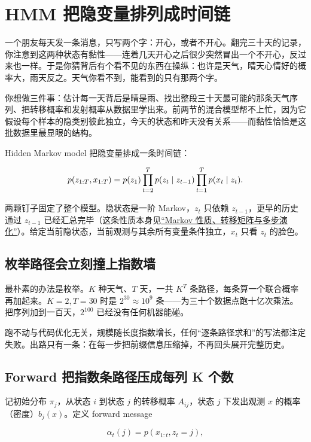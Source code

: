 \section{HMM 把隐变量排列成时间链}
\label{sec:13-Machine-Learning/06-Probabilistic-Models/05}

一个朋友每天发一条消息，只写两个字：开心，或者不开心。翻完三十天的记录，你注意到这两种状态有黏性——连着几天开心之后很少突然冒出一个不开心，反过来也一样。于是你猜背后有个看不见的东西在操纵：也许是天气，晴天心情好的概率大，雨天反之。天气你看不到，能看到的只有那两个字。

你想做三件事：估计每一天背后是晴是雨、找出整段三十天最可能的那条天气序列、把转移概率和发射概率从数据里学出来。前两节的混合模型帮不上忙，因为它假设每个样本的隐类别彼此独立，今天的状态和昨天没有关系——而黏性恰恰是这批数据里最显眼的结构。

Hidden Markov model 把隐变量排成一条时间链：

\[
p(z_{1:T},x_{1:T})
=p(z_1)\prod_{t=2}^Tp(z_t\mid z_{t-1})\prod_{t=1}^Tp(x_t\mid z_t).
\]

两颗钉子固定了整个模型。隐状态是一阶 Markov，\(z_t\) 只依赖 \(z_{t-1}\)，更早的历史通过 \(z_{t-1}\) 已经汇总完毕（这条性质本身见\hyperref[sec:06-Random-Processes/03-Markov-Chains/01]{``Markov 性质、转移矩阵与多步演化''}）。给定当前隐状态，当前观测与其余所有变量条件独立，\(x_t\) 只看 \(z_t\) 的脸色。

\subsection{枚举路径会立刻撞上指数墙}

最朴素的办法是枚举。\(K\) 种天气、\(T\) 天，一共 \(K^{T}\) 条路径，每条算一个联合概率再加起来。\(K=2,T=30\) 时是 \(2^{30}\approx10^9\) 条——为三十个数据点跑十亿次乘法。把序列加到一百天，\(2^{100}\) 已经没有任何机器能碰。

跑不动与代码优化无关，规模随长度指数增长，任何``逐条路径求和''的写法都注定失败。出路只有一条：在每一步把前缀信息压缩掉，不再回头展开完整历史。

\subsection{Forward 把指数条路径压成每列 K 个数}

记初始分布 \(\pi_j\)，从状态 \(i\) 到状态 \(j\) 的转移概率 \(A_{ij}\)，状态 \(j\) 下发出观测 \(x\) 的概率（密度）\(b_j(x)\)。定义 forward message

\[
\alpha_t(j)=p(x_{1:t},z_t=j),
\]


